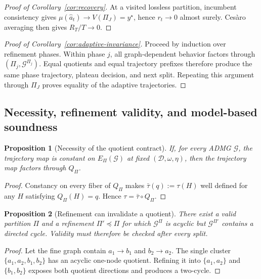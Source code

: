 \documentclass[twoside]{article}
\newtheorem{proposition}{Proposition}
\newcommand{\Gg}{\mathcal{G}}
\begin{document}
\begin{proof}[Proof of Corollary~\ref{cor:recovery}]
At a visited lossless partition, incumbent consistency gives
$\mu(\hat a_t)\to V(\Pi_J)=y^\star$, hence $r_t\to0$ almost surely.
Ces\`aro averaging then gives $R_T/T\to0$.
\end{proof}

\begin{proof}[Proof of Corollary~\ref{cor:adaptive-invariance}]
Proceed by induction over refinement phases. Within phase $j$, all
graph-dependent behavior factors through $(\Pi_j,\Gg^{\Pi_j})$. Equal
quotients and equal trajectory prefixes therefore produce the same phase
trajectory, plateau decision, and next split. Repeating this argument through
$\Pi_J$ proves equality of the adaptive trajectories.
\end{proof}

\subsection{Necessity, refinement validity, and model-based soundness}

\begin{proposition}[Necessity of the quotient contract]
\label{prop:converse}
If, for every ADMG $\Gg$, the trajectory map is constant on
$E_\Pi(\Gg)$ at fixed $(\mathcal D,\omega,\eta)$, then the trajectory map
factors through $Q_\Pi$.
\end{proposition}

\begin{proof}
Constancy on every fiber of $Q_\Pi$ makes
$\bar\tau(q):=\tau(H)$ well defined for any $H$ satisfying
$Q_\Pi(H)=q$. Hence $\tau=\bar\tau\circ Q_\Pi$.
\end{proof}

\begin{proposition}[Refinement can invalidate a quotient]
\label{prop:refinement-validity}
There exist a valid partition $\Pi$ and a refinement $\Pi'\preceq\Pi$ for
which $\Gg^\Pi$ is acyclic but $\Gg^{\Pi'}$ contains a directed cycle.
Validity must therefore be checked after every split.
\end{proposition}

\begin{proof}
Let the fine graph contain $a_1\to b_1$ and $b_2\to a_2$. The single
cluster $\{a_1,a_2,b_1,b_2\}$ has an acyclic one-node quotient. Refining
it into $\{a_1,a_2\}$ and $\{b_1,b_2\}$ exposes both quotient directions
and produces a two-cycle.
\end{proof}
\end{document}
